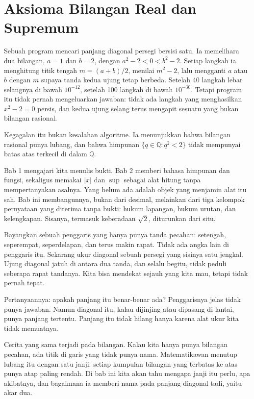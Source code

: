 \chapter{Aksioma Bilangan Real dan Supremum}

Sebuah program mencari panjang diagonal persegi bersisi satu. Ia memelihara dua
bilangan, $a=1$ dan $b=2$, dengan $a^2-2<0<b^2-2$. Setiap langkah ia menghitung titik
tengah $m=(a+b)/2$, menilai $m^2-2$, lalu mengganti $a$ atau $b$ dengan $m$ supaya
tanda kedua ujung tetap berbeda. Setelah 40 langkah lebar selangnya di bawah $10^{-12}$,
setelah 100 langkah di bawah $10^{-30}$. Tetapi program itu tidak pernah mengeluarkan
jawaban: tidak ada langkah yang menghasilkan $x^2-2=0$ persis, dan kedua ujung selang
terus mengapit sesuatu yang bukan bilangan rasional.

Kegagalan itu bukan kesalahan algoritme. Ia menunjukkan bahwa bilangan rasional punya
lubang, dan bahwa himpunan $\{q\in\mathbb{Q}: q^2<2\}$ tidak mempunyai batas atas
terkecil di dalam $\mathbb{Q}$.

Bab 1 mengajari kita menulis bukti. Bab 2 memberi bahasa himpunan dan fungsi, sekaligus
memakai $|x|$ dan $\sup$ sebagai alat hitung tanpa mempertanyakan asalnya. Yang belum
ada adalah objek yang menjamin alat itu sah. Bab ini membangunnya, bukan dari desimal,
melainkan dari tiga kelompok pernyataan yang diterima tanpa bukti: hukum lapangan,
hukum urutan, dan kelengkapan. Sisanya, termasuk keberadaan $\sqrt{2}$, diturunkan
dari situ.

\begin{untukanak}
Bayangkan sebuah penggaris yang hanya punya tanda pecahan: setengah, seperempat,
seperdelapan, dan terus makin rapat. Tidak ada angka lain di penggaris itu. Sekarang
ukur diagonal sebuah persegi yang sisinya satu jengkal. Ujung diagonal jatuh di antara
dua tanda, dan selalu begitu, tidak peduli seberapa rapat tandanya. Kita bisa mendekat
sejauh yang kita mau, tetapi tidak pernah tepat.

Pertanyaannya: apakah panjang itu benar-benar ada? Penggarisnya jelas tidak punya
jawaban. Namun diagonal itu, kalau dijinjing atau dipasang di lantai, punya panjang
tertentu. Panjang itu tidak hilang hanya karena alat ukur kita tidak memuatnya.

Cerita yang sama terjadi pada bilangan. Kalau kita hanya punya bilangan pecahan, ada
titik di garis yang tidak punya nama. Matematikawan menutup lubang itu dengan satu
janji: setiap kumpulan bilangan yang terbatas ke atas punya atap paling rendah. Di bab
ini kita akan tahu mengapa janji itu perlu, apa akibatnya, dan bagaimana ia memberi
nama pada panjang diagonal tadi, yaitu akar dua.
\end{untukanak}

